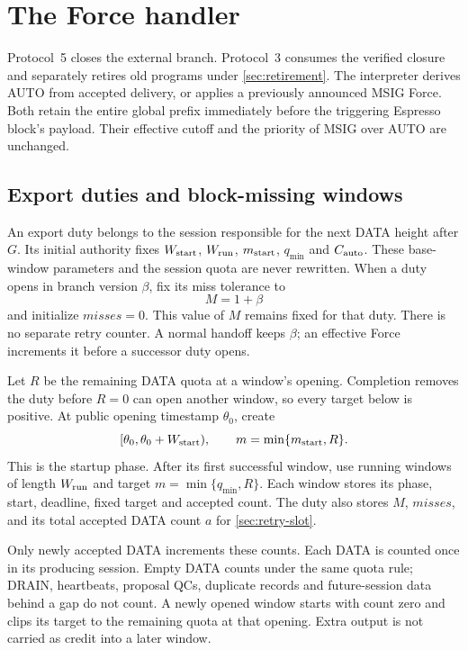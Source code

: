\section{The Force handler}
\label{sec:force}
Protocol~5 closes the external branch. Protocol~3 consumes the verified
closure and separately retires old programs under \cref{sec:retirement}.
The interpreter derives AUTO from accepted delivery, or applies a
previously announced MSIG Force. Both retain the entire global prefix
immediately before the triggering Espresso block's payload. Their
effective cutoff and the priority of MSIG over AUTO are unchanged.

\subsection{Export duties and block-missing windows}
\label{sec:windows}
An export duty belongs to the session responsible for the next DATA
height after $G$. Its initial authority fixes $W_{\rm start}$,
$W_{\rm run}$, $m_{\rm start}$, $q_{\min}$ and $C_{\rm auto}$.
These base-window parameters and the session quota are never rewritten.
When a duty opens in branch version $\beta$, fix its miss tolerance to
\[
 M=1+\beta
\]
and initialize $\mathit{misses}=0$. This value of $M$ remains fixed for
that duty. There is no separate retry counter. A normal handoff keeps
$\beta$; an effective Force increments it before a successor duty opens.

Let $R$ be the remaining DATA quota at a window's opening. Completion
removes the duty before $R=0$ can open another window, so every target
below is positive. At public opening timestamp $\theta_0$, create
\[
 [\theta_0,\theta_0+W_{\rm start}),\qquad
 m=\min\{m_{\rm start},R\}.
\]
This is the startup phase. After its first successful window, use
running windows of length $W_{\rm run}$ and target
$m=\min\{q_{\min},R\}$. Each window stores its phase, start, deadline,
fixed target and accepted count. The duty also stores $M$,
$\mathit{misses}$, and its total accepted DATA count $a$ for
\cref{sec:retry-slot}.

Only newly accepted DATA increments these counts. Each DATA is counted
once in its producing session. Empty DATA counts under the same quota
rule; DRAIN, heartbeats, proposal QCs, duplicate records and
future-session data behind a gap do not count. A newly opened window
starts with count zero and clips its target to the remaining quota at
that opening. Extra output is not carried as credit into a later window.

